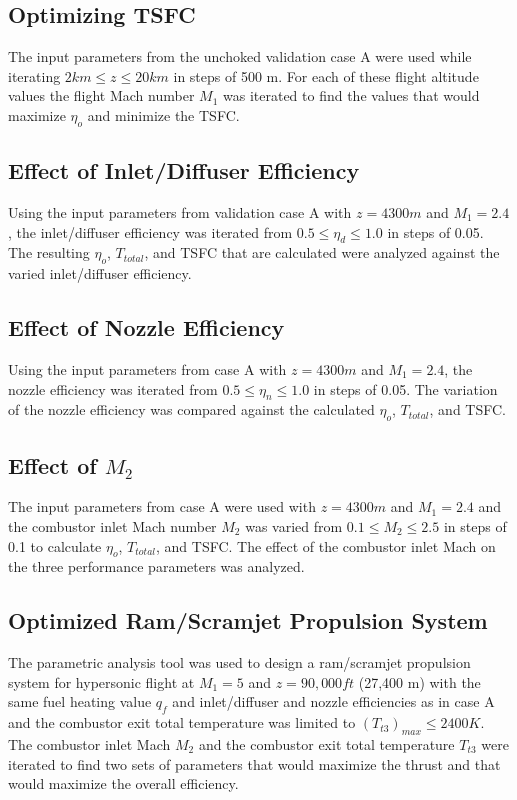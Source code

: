 \documentclass[conf]{new-aiaa} %
\begin{document}
\subsection{Optimizing TSFC} %
The input parameters from the unchoked validation case A were used while iterating $2 km \leq z \leq 20 km$ in steps of 500 m. For each of these flight altitude values the flight Mach number $M_1$ was iterated to find the values that would maximize $\eta_o$ and minimize the TSFC.

\subsection{Effect of Inlet/Diffuser Efficiency} %
Using the input parameters from validation case A with $z=4300m$ and $M_1=2.4$, the inlet/diffuser efficiency was iterated from $0.5\leq\eta_d\leq1.0$ in steps of 0.05. The resulting $\eta_o$, $T_{total}$, and TSFC that are calculated were analyzed against the varied inlet/diffuser efficiency.

\subsection{Effect of Nozzle Efficiency} %
Using the input parameters from case A with $z=4300m$ and $M_1=2.4$, the nozzle efficiency was iterated from $0.5\leq\eta_n\leq1.0$ in steps of 0.05. The variation of the nozzle efficiency was compared against the calculated $\eta_o$, $T_{total}$, and TSFC.

\subsection{Effect of \texorpdfstring{\textit{$M_2$}}{M2}} %
The input parameters from case A were used with $z=4300m$ and $M_1=2.4$ and the combustor inlet Mach number $M_2$ was varied from $0.1\leq M_2\leq2.5$ in steps of 0.1 to calculate $\eta_o$, $T_{total}$, and TSFC. The effect of the combustor inlet Mach on the three performance parameters was analyzed.

\subsection{Optimized Ram/Scramjet Propulsion System} %
The parametric analysis tool was used to design a ram/scramjet propulsion system for hypersonic flight at $M_1=5$ and $z=90,000ft$ (27,400 m) with the same fuel heating value $q_f$ and inlet/diffuser and nozzle efficiencies as in case A and the combustor exit total temperature was limited to $\left(T_{t3}\right)_{max}\leq2400K$. The combustor inlet Mach $M_2$ and the combustor exit total temperature $T_{t3}$ were iterated to find two sets of parameters that would maximize the thrust and that would maximize the overall efficiency.
\end{document}
